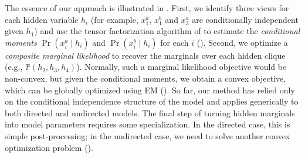 The essence of our approach is illustrated in . 
First, we identify three views for each hidden variable $h_i$ (for example,
$x_1^a$, $x_1^b$ and $x_3^a$ are conditionally independent given $h_1$) and use
the tensor factorization algorithm of
\citet{anandkumar13tensor} to estimate the \emph{conditional
moments} $\Pr(x_i^a \mid h_i)$ and $\Pr(x_i^b \mid h_i)$ for each $i$ ().
Second, we optimize a \emph{composite marginal likelihood} to recover the marginals over
each hidden clique (e.g., $\mathbb P(h_2, h_3, h_4)$).
Normally, such a marginal likelihood objective would be non-convex,
but given the conditional moments, we obtain a convex objective,
which can be globally optimized using EM ().
So far, our method has relied only on the conditional independence
structure of the model and applies generically to both directed
and undirected models.
The final step of turning hidden marginals into model parameters
requires some specialization.
In the directed case, this is simple post-processing;
in the undirected case, we need to solve another convex optimization problem ().
